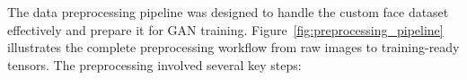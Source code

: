 \documentclass[a4paper, journal]{IEEEtran}
\begin{document}
The data preprocessing pipeline was designed to handle the custom face dataset effectively and prepare it for GAN training. Figure~\ref{fig:preprocessing_pipeline} illustrates the complete preprocessing workflow from raw images to training-ready tensors. The preprocessing involved several key steps:

\end{document}
